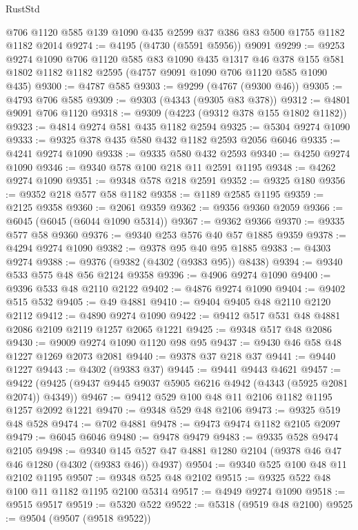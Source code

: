 \begin{lexlean}{RustStd}
\begin{coremodule}
    @706
    @1120
    @585
    @139
    @1090
    @435
    @2599
    @37
    @386
    @83
    @500
    @1755
    @1182
    @1182
    @2014
@9274 := @4195 (@4730 (@5591 @5956)) @9091
@9299 := @9253
    @9274
    @1090
    @706
    @1120
    @585
    @83
    @1090
    @435
    @1317
    @46
    @378
    @155
    @581
    @1802
    @1182
    @1182
    @2595
    (@4757 @9091 @1090 @706 @1120 @585 @1090 @435)
@9300 := @4787 @585
@9303 := @9299 (@4767 (@9300 @46))
@9305 := @4793 @706 @585
@9309 := @9303 (@4343 (@9305 @83 @378))
@9312 := @4801 @9091 @706 @1120
@9318 := @9309 (@4223 (@9312 @378 @155 @1802 @1182))
@9323 := @4814 @9274 @581 @435 @1182 @2594
@9325 := @5304 @9274 @1090
@9333 := @9325 @378 @435 @580 @432 @1182 @2593 @2056 @6046
@9335 := @4241 @9274 @1090
@9338 := @9335 @580 @432 @2593
@9340 := @4250 @9274 @1090
@9346 := @9340 @578 @100 @218 @11 @2591 @1195
@9348 := @4262 @9274 @1090
@9351 := @9348 @578 @218 @2591
@9352 := @9325 @180
@9356 := @9352 @218 @577 @58 @1182
@9358 := @1189 @2585 @1195
@9359 := @2125 @9358
@9360 := @2061 @9359
@9362 := @9356 @9360 @2059
@9366 := @6045 (@6045 (@6044 @1090 @5314))
@9367 := @9362 @9366
@9370 := @9335 @577 @58 @9360
@9376 := @9340 @253 @576 @40 @57 @1885 @9359
@9378 := @4294 @9274 @1090
@9382 := @9378 @95 @40 @95 @1885
@9383 := @4303 @9274
@9388 := @9376 (@9382 (@4302 (@9383 @95)) @8438)
@9394 := @9340 @533 @575 @48 @56 @2124 @9358
@9396 := @4906 @9274 @1090
@9400 := @9396 @533 @48 @2110 @2122
@9402 := @4876 @9274 @1090
@9404 := @9402 @515 @532
@9405 := @49 @4881
@9410 := @9404 @9405 @48 @2110 @2120 @2112
@9412 := @4890 @9274 @1090
@9422 := @9412 @517 @531 @48 @4881 @2086 @2109 @2119 @1257 @2065 @1221
@9425 := @9348 @517 @48 @2086
@9430 := @9009 @9274 @1090 @1120 @98 @95
@9437 := @9430 @46 @58 @48 @1227 @1269 @2073 @2081
@9440 := @9378 @37 @218 @37
@9441 := @9440 @1227
@9443 := @4302 (@9383 @37)
@9445 := @9441 @9443 @4621
@9457 := @9422 (@9425 (@9437 @9445 @9037 @5905 @6216 @4942 (@4343 (@5925 @2081 @2074)) @4349))
@9467 := @9412 @529 @100 @48 @11 @2106 @1182 @1195 @1257 @2092 @1221
@9470 := @9348 @529 @48 @2106
@9473 := @9325 @519 @48 @528
@9474 := @702 @4881
@9478 := @9473 @9474 @1182 @2105 @2097
@9479 := @6045 @6046
@9480 := @9478 @9479
@9483 := @9335 @528 @9474 @2105
@9498 := @9340 @145 @527 @47 @4881 @1280 @2104 (@9378 @46 @47 @46 @1280 (@4302 (@9383 @46)) @4937)
@9504 := @9340 @525 @100 @48 @11 @2102 @1195
@9507 := @9348 @525 @48 @2102
@9515 := @9325 @522 @48 @100 @11 @1182 @1195 @2100 @5314
@9517 := @4949 @9274 @1090
@9518 := @9515 @9517
@9519 := @5320 @522
@9522 := @5318 (@9519 @48 @2100)
@9525 := @9504 (@9507 (@9518 @9522))

\end{coremodule}
\end{lexlean}
